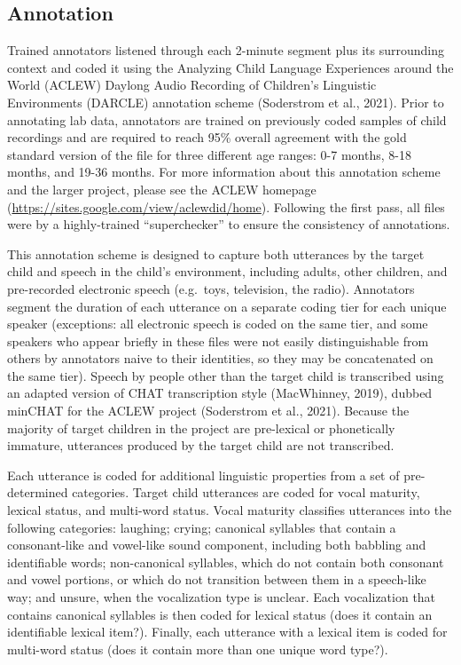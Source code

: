 \documentclass[
  man,floatsintext]{apa6}
\begin{document}
\hypertarget{annotation}{%
\subsection{Annotation}\label{annotation}}

Trained annotators listened through each 2-minute segment plus its surrounding context and coded it using the Analyzing Child Language Experiences around the World (ACLEW) Daylong Audio Recording of Children's Linguistic Environments (DARCLE) annotation scheme (Soderstrom et al., 2021). Prior to annotating lab data, annotators are trained on previously coded samples of child recordings and are required to reach 95\% overall agreement with the gold standard version of the file for three different age ranges: 0-7 months, 8-18 months, and 19-36 months. For more information about this annotation scheme and the larger project, please see the ACLEW homepage (\url{https://sites.google.com/view/aclewdid/home}). Following the first pass, all files were by a highly-trained ``superchecker'' to ensure the consistency of annotations.

This annotation scheme is designed to capture both utterances by the target child and speech in the child's environment, including adults, other children, and pre-recorded electronic speech (e.g.~toys, television, the radio). Annotators segment the duration of each utterance on a separate coding tier for each unique speaker (exceptions: all electronic speech is coded on the same tier, and some speakers who appear briefly in these files were not easily distinguishable from others by annotators naive to their identities, so they may be concatenated on the same tier). Speech by people other than the target child is transcribed using an adapted version of CHAT transcription style (MacWhinney, 2019), dubbed minCHAT for the ACLEW project (Soderstrom et al., 2021). Because the majority of target children in the project are pre-lexical or phonetically immature, utterances produced by the target child are not transcribed.

Each utterance is coded for additional linguistic properties from a set of pre-determined categories. Target child utterances are coded for vocal maturity, lexical status, and multi-word status. Vocal maturity classifies utterances into the following categories: laughing; crying; canonical syllables that contain a consonant-like and vowel-like sound component, including both babbling and identifiable words; non-canonical syllables, which do not contain both consonant and vowel portions, or which do not transition between them in a speech-like way; and unsure, when the vocalization type is unclear. Each vocalization that contains canonical syllables is then coded for lexical status (does it contain an identifiable lexical item?). Finally, each utterance with a lexical item is coded for multi-word status (does it contain more than one unique word type?).
\end{document}

